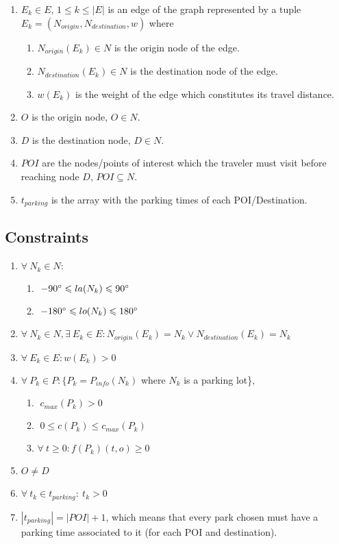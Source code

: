 \documentclass[a4paper, 12pt]{report}
\begin{document}
\begin{enumerate}
        \item $E_{k} \in E$, $1 \leqslant k \leqslant |E|$ is an edge of the graph represented by a tuple $E_k = (N_{origin}, N_{destination}, w)$ where
        \begin{enumerate}
            \item $N_{origin}(E_k) \in N$ is the origin node of the edge.
            \item $N_{destination}(E_k) \in N$ is the destination node of the edge.
            \item $w(E_k)$ is the weight of the edge which constitutes its travel distance.
        \end{enumerate}
    
        \item $O$ is the origin node, $O \in N$.
        \item $D$ is the destination node, $D \in N$.
        \item $POI$ are the nodes/points of interest which the traveler must visit before reaching node $D$, $POI \subseteq N$.
        \item $t_{parking}$ is the array with the parking times of each POI/Destination.
    \end{enumerate}
    
    \subsection{Constraints}
    
    \begin{enumerate}
        \item $\forall \: N_k \in N : $
        \begin{enumerate}
            \item $ \; -90\degree \leqslant la(N_k) \leqslant 90\degree $
            \item $ \; -180\degree \leqslant lo(N_k) \leqslant 180\degree$
        \end{enumerate}
        \item $\forall \: N_k \in N, \exists \: E_k \in E : N_{origin}(E_k) = N_k \lor  N_{destination}(E_k) = N_k $
        \item $\forall \: E_k \in E : w(E_k) > 0$ 
        \item $\forall \: P_{k} \in P : \{P_k = P_{info}(N_k)$ where $N_k$ is a parking lot\}, 
        \begin{enumerate}
            \item $ \; c_{max}(P_k) > 0 \;$
            \item $\; 0 \leqslant c(P_k) \leqslant  c_{max}(P_k) \;$
            \item $ \forall \: t \geqslant 0: f(P_k)(t,o) \geqslant 0$
        \end{enumerate}
        \item $O \neq D$
        \item $\forall \: t_k \in t_{parking}: \: t_k > 0$
        \item $|t_{parking}| = |POI| + 1$, which means that every park chosen must have a parking time associated to it (for each POI and destination).
    \end{enumerate}
    
\end{document}
